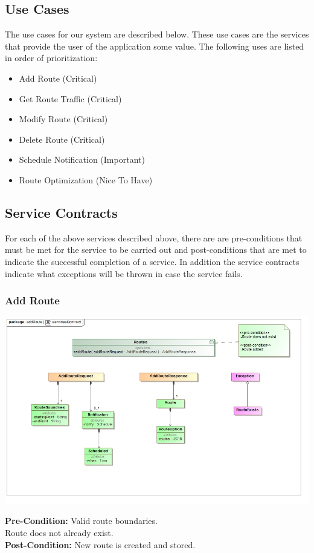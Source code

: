 \documentclass[a4paper,12pt]{article}
\begin{document}
\subsection{Use Cases}
The use cases for our system are described below. These use cases are the services that provide the user of the application some value. The following uses are listed in order of prioritization:
\begin{itemize}
\item Add Route 			(Critical)
\item Get Route Traffic		(Critical)
\item Modify Route			(Critical)
\item Delete Route			(Critical)
\item Schedule Notification (Important)
\item Route Optimization 	(Nice To Have)
\end{itemize}
\subsection{Service Contracts}
For each of the above services described above, there are are pre-conditions that must be met for the service to be carried out and post-conditions that are met to indicate the successful completion of a service. In addition the service contracts indicate what exceptions will be thrown in case the service fails.

\subsubsection{Add Route}
\includegraphics[width=\textwidth]{images/scAdd_Route.jpg}


\textbf{Pre-Condition: }
Valid route boundaries.\\
Route does not already exist.\\
\textbf{Post-Condition: }
New route is created and stored.\\
\end{document}
